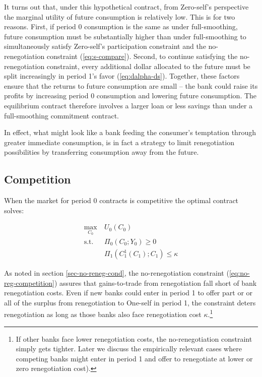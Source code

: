 \documentclass[11pt,english]{article}
\theoremstyle{plain}
\theoremstyle{definition}
\begin{document}
It turns out that, under this hypothetical contract, from Zero-self's perspective the marginal utility of future consumption is relatively low. This is for two reasons. First, if period 0 consumption is the same as under full-smoothing, future consumption must be substantially higher than under full-smoothing to simultaneously satisfy Zero-self's participation constraint and the no-renegotiation constraint (\ref{eq:s-compare}). Second, to continue satisfying the no-renegotiation constraint, every additional dollar allocated to the future must be split increasingly in period 1's favor (\ref{eq:dalpha-ds}). Together, these factors ensure that the returns to future consumption are small -- the bank could raise its profits by increasing period 0 consumption and lowering future consumption. The equilibrium contract therefore involves a larger loan or less savings than under a full-smoothing commitment contract. 

In effect, what might look like a bank feeding the consumer's temptation through greater immediate consumption, is in fact a strategy to limit renegotiation possibilities by transferring consumption
away from the future.

\subsection{Competition}

When the market for period 0 contracts is competitive the optimal
contract solves:

\begin{align}
\max_{C_{0}} & \ U_{0}\left(C_{0}\right)\label{eq:comp-max}\\
\text{s.t.} & \ \Pi_{0}\left(C_{0};Y_{0}\right)\geq0\label{eq:comp-pc}\\
 & \ \Pi_{1}\left(C_{1}^{1}\left(C_{1}\right);C_{1}\right)\leq\kappa\label{eq:no-reg-competition}
\end{align}

As noted in section \ref{sec-no-reneg-cond}, the no-renegotiation
constraint (\ref{eq:no-reg-competition}) assures that gains-to-trade from
renegotiation fall short of bank renegotiation costs. Even if new
banks could enter in period 1 to offer part or or all of the surplus
from renegotiation to One-self in period 1, the constraint deters renegotiation
as long as those banks also face renegotiation cost $\kappa$.\footnote{If other banks face lower renegotiation costs, the no-renegotiation constraint simply gets tighter. Later we discuss the empirically relevant cases where competing banks
might enter in period 1 and offer to renegotiate at lower or zero
renegotiation cost).}
\end{document}
